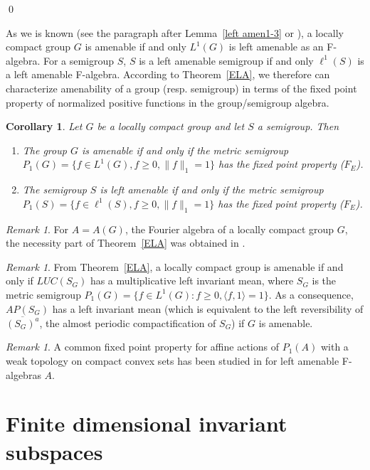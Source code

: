\documentclass{tran-l}
\numberwithin{equation}{section}
\newtheorem{cor}[thm]{Corollary}
\theoremstyle{definition}
\theoremstyle{remark}
\newtheorem{remark}[thm]{Remark}
\begin{document}
\qed

As we is known (see  the paragraph after Lemma~\ref{left amen1-3} or \cite{Lau_F}), a locally compact group $G$ is amenable if and only $L^1(G)$ is left amenable as an F-algebra. For a semigroup $S$, $S$ is a left amenable semigroup if and only $\ell^1(S)$ is a left amenable F-algebra. According to Theorem~\ref{ELA}, we therefore can characterize amenability of a group (resp.  semigroup) in terms of the fixed point property of normalized positive functions in the group/semigroup algebra.

\begin{cor}\label{amen gp semigp}
Let $G$ be a locally compact group and let $S$ a semigroup. Then
\begin{enumerate}
\item The group $G$ is amenable if and only if the metric semigroup $P_1(G)=\{f\in L^1(G), f\geq 0, \|f\|_1 = 1\}$ has the fixed point property ($F_E$).
\item The semigroup $S$ is left amenable if and only if the metric semigroup $P_1(S)=\{f\in \ell^1(S), f\geq 0, \|f\|_1 = 1\}$ has the fixed point property ($F_E$).
\end{enumerate}
\end{cor}

\begin{remark}
For $A=A(G)$, the Fourier algebra of a locally compact group $G$, the necessity part of Theorem~\ref{ELA} was obtained in \cite{Lau_AG}.
\end{remark}

\begin{remark}
From Theorem~\ref{ELA}, a locally compact group is amenable if and only if $LUC(S_G)$ has a multiplicative left invariant mean, where $S_G$ is the metric semigroup $P_1(G) =\{f\in L^1(G): f\geq 0, {\langle} f, 1 {\rangle} =1\}$. As a consequence, $AP(S_G)$ has a left invariant mean (which is equivalent to the left reversibility of $\overline{(S_G)^a}$, the almost periodic compactification of $S_G$) if  $G$ is amenable. 
\end{remark}

\begin{remark}
A common fixed point property for affine actions of $P_1(A)$ with a weak topology on compact convex sets has been studied in \cite{D-N-N} for left amenable F-algebras $A$.
\end{remark}

\section{Finite dimensional invariant subspaces}\label{sec 4}
\end{document}
